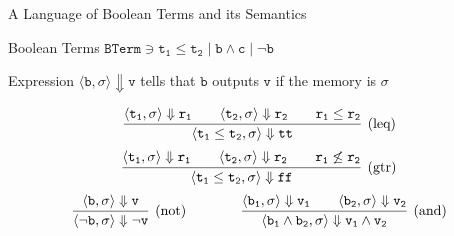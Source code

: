 \documentclass{beamer}
\begin{document}
\begin{frame}{A Language of Boolean Terms and its Semantics}

        \begin{block}{Boolean Terms}
        $\mathtt{BTerm} \ni \mathtt{t_1 \leq t_2} \mid \mathtt{b \wedge c}
        \mid \mathtt{\neg b}$
	\end{block}
        Expression $\langle \mathtt{b},\sigma \rangle \Downarrow
        \mathtt{v}$ tells that $\mathtt{b}$ outputs
        $\mathtt{v}$ if the memory is $\sigma$

        \[
                \infer[(\text{leq})]
                { 
                        \langle \mathtt{t_1 \leq t_2}, \sigma \rangle \Downarrow \mathtt{tt} 
                }
                {
                        \langle \mathtt{t_1}, \sigma \rangle \Downarrow \mathtt{r_1} \qquad
                        \langle \mathtt{t_2}, \sigma \rangle \Downarrow \mathtt{r_2}
                        \qquad \mathtt{r_1 \leq r_2}
                } 
        \] 
        \vspace{0.1cm}
        \[
                \infer[(\text{gtr})]
                { 
                        \langle \mathtt{t_1 \leq t_2}, \sigma \rangle \Downarrow \mathtt{ff} 
                }
                {
                        \langle \mathtt{t_1}, \sigma \rangle \Downarrow \mathtt{r_1} \qquad
                        \langle \mathtt{t_2}, \sigma \rangle \Downarrow \mathtt{r_2}
                        \qquad \mathtt{r_1 \not \leq r_2}
                }
        \]
        \vspace{0.1cm}
        \[        
                \infer[(\text{not})]{  
                        \langle \mathtt{\neg \mathtt{b}}, \sigma \rangle \Downarrow 
                        \mathtt{\neg v}
                        }{
                        \langle \mathtt{b}, \sigma \rangle \Downarrow \mathtt{v}
                } \qquad \qquad
                \infer[(\text{and})]{  
                        \langle \mathtt{b_1} \wedge \mathtt{b_2}, \sigma \rangle \Downarrow 
                        \mathtt{v_1 \wedge v_2}
                        }{
                        \langle \mathtt{b_1}, \sigma \rangle \Downarrow \mathtt{v_1} \qquad
                        \langle \mathtt{b_2}, \sigma \rangle \Downarrow \mathtt{v_2}
                }
        \]
\end{frame}        
\end{document}
